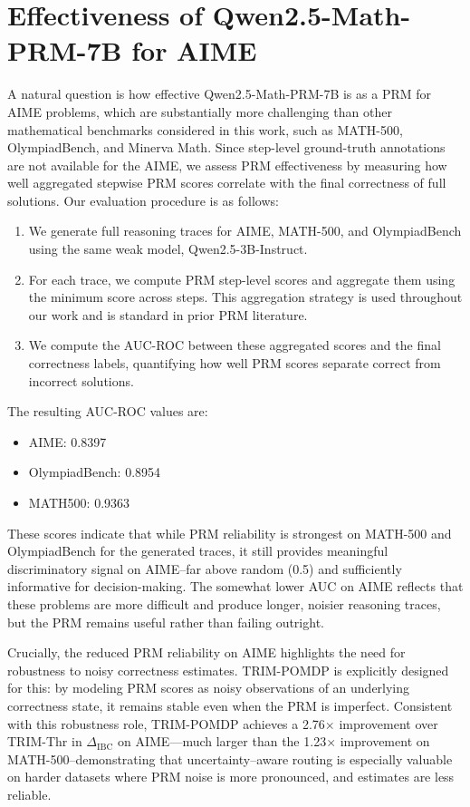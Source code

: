\documentclass{article}
\theoremstyle{plain}
\theoremstyle{definition}
\theoremstyle{remark}
\begin{document}
\section{Effectiveness of Qwen2.5-Math-PRM-7B for AIME}
\label{sec:prm_aime}
A natural question is how effective Qwen2.5-Math-PRM-7B is as a PRM for AIME problems, which are substantially more challenging than other mathematical benchmarks considered in this work, such as MATH-500, OlympiadBench, and Minerva Math. Since step-level ground-truth annotations are not available for the AIME, we assess PRM effectiveness by measuring how well aggregated stepwise PRM scores correlate with the final correctness of full solutions. Our evaluation procedure is as follows:
\begin{enumerate}
    \item We generate full reasoning traces for AIME, MATH-500, and OlympiadBench using the same weak model, Qwen2.5-3B-Instruct.
    \item For each trace, we compute PRM step-level scores and aggregate them using the minimum score across steps. This aggregation strategy is used throughout our work and is standard in prior PRM literature.
    \item We compute the AUC-ROC between these aggregated scores and the final correctness labels, quantifying how well PRM scores separate correct from incorrect solutions.
\end{enumerate}
The resulting AUC-ROC values are:
\begin{itemize}
    \item AIME: 0.8397
    \item OlympiadBench: 0.8954
    \item MATH500: 0.9363
\end{itemize}
These scores indicate that while PRM reliability is strongest on MATH-500 and OlympiadBench for the generated traces, it still provides meaningful discriminatory signal on AIME--far above random (0.5) and sufficiently informative for decision-making. The somewhat lower AUC on AIME reflects that these problems are more difficult and produce longer, noisier reasoning traces, but the PRM remains useful rather than failing outright.

Crucially, the reduced PRM reliability on AIME highlights the need for robustness to noisy correctness estimates. TRIM-POMDP is explicitly designed for this: by modeling PRM scores as noisy observations of an underlying correctness state, it remains stable even when the PRM is imperfect. Consistent with this robustness role, TRIM-POMDP achieves a 2.76$\times$ improvement over TRIM-Thr in $\Delta_{\text{IBC}}$ on AIME—much larger than the 1.23$\times$ improvement on MATH-500--demonstrating that uncertainty--aware routing is especially valuable on harder datasets where PRM noise is more pronounced, and estimates are less reliable.
\end{document}
